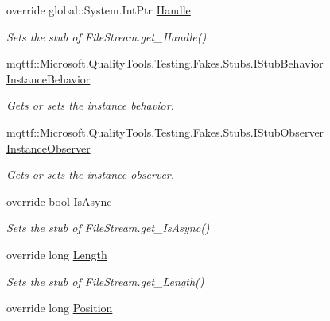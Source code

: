 \begin{DoxyCompactItemize}
override global\-::\-System.\-Int\-Ptr \hyperlink{class_system_1_1_i_o_1_1_fakes_1_1_stub_file_stream_a86b7082be92367557a30d4955b1939a7}{Handle}
\begin{DoxyCompactList}\small\item\em Sets the stub of File\-Stream.\-get\-\_\-\-Handle()\end{DoxyCompactList}\item 
mqttf\-::\-Microsoft.\-Quality\-Tools.\-Testing.\-Fakes.\-Stubs.\-I\-Stub\-Behavior \hyperlink{class_system_1_1_i_o_1_1_fakes_1_1_stub_file_stream_aa6711c24971e56dd573df81d5e31c9d3}{Instance\-Behavior}
\begin{DoxyCompactList}\small\item\em Gets or sets the instance behavior.\end{DoxyCompactList}\item 
mqttf\-::\-Microsoft.\-Quality\-Tools.\-Testing.\-Fakes.\-Stubs.\-I\-Stub\-Observer \hyperlink{class_system_1_1_i_o_1_1_fakes_1_1_stub_file_stream_a337b7889533dc811555b388caf4ec8cf}{Instance\-Observer}
\begin{DoxyCompactList}\small\item\em Gets or sets the instance observer.\end{DoxyCompactList}\item 
override bool \hyperlink{class_system_1_1_i_o_1_1_fakes_1_1_stub_file_stream_a1f5ce59cd69a8c391d69526ca69a04c8}{Is\-Async}
\begin{DoxyCompactList}\small\item\em Sets the stub of File\-Stream.\-get\-\_\-\-Is\-Async()\end{DoxyCompactList}\item 
override long \hyperlink{class_system_1_1_i_o_1_1_fakes_1_1_stub_file_stream_ab0dd1dce45a156589607f01399222d7a}{Length}
\begin{DoxyCompactList}\small\item\em Sets the stub of File\-Stream.\-get\-\_\-\-Length()\end{DoxyCompactList}\item 
override long \hyperlink{class_system_1_1_i_o_1_1_fakes_1_1_stub_file_stream_a327db6cff7ff7dcdab3eb56c43fd0b49}{Position}

\end{DoxyCompactItemize}

